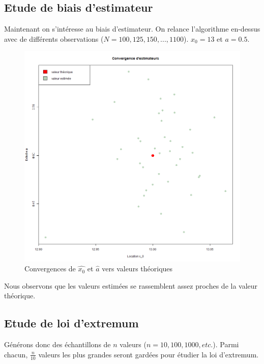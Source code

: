 \documentclass[12pt,a4paper,titlepage]{article}
\numberwithin{equation}{section}
\begin{document}
\subsection{Etude de biais d'estimateur}

Maintenant on s'intéresse au biais d'estimateur. On relance l'algorithme en-dessus avec de différents observations ($N = 100, 125, 150,..., 1100$). $x_0 = 13$ et $a = 0.5$.



\begin{figure}[h]
\includegraphics[width=\linewidth]{images/Cauchy_convergence_parametres.png}
\caption{Convergences de $\hat{x_0}$ et $\hat{a}$ vers valeurs théoriques}
\end{figure}

Nous observons que les valeurs estimées se rassemblent assez proches de la valeur théorique.

\subsection{Etude de loi d'extremum}

Générons donc des échantillons de $n$ valeurs ($n=10, 100, 1000, etc.$). Parmi chacun, $\frac{n}{10}$ valeurs les plus grandes seront gardées pour étudier la loi d'extremum.
\end{document}
